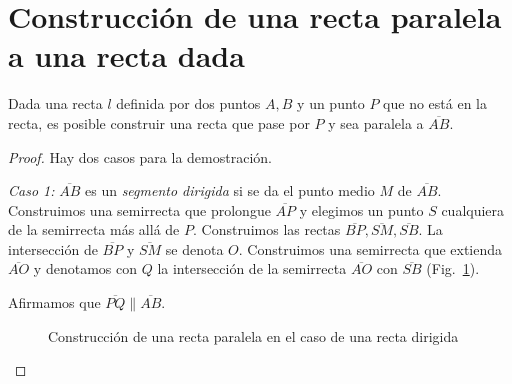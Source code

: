 \section{Construcción de una recta paralela a una recta dada}\label{s.parallel}

\begin{theorem}\label{thm.straight-parallel}
Dada una recta $l$ definida por dos puntos $A,B$ y un punto $P$ que no está en la recta, es posible construir una recta que pase por $P$ y sea paralela a $\overline{AB}$.
\end{theorem}

\begin{proof}

Hay dos casos para la demostración.

\textit{Caso 1:}
$\overline{AB}$ es un \emph{segmento dirigida} si se da el punto medio $M$ de $\overline{AB}$.  Construimos una semirrecta que prolongue $\overline{AP}$ y elegimos un punto $S$ cualquiera de la semirrecta más allá de $P$. Construimos las rectas $\overline{BP}, \overline{SM}, \overline{SB}$. La intersección de $\overline{BP}$ y $\overline{SM}$ se denota $O$. Construimos una semirrecta que extienda $\overline{AO}$ y denotamos con $Q$ la intersección de la semirrecta $\overline{AO}$ con $\overline{SB}$ (Fig.~\ref{f.se-parallel-directed}).

Afirmamos que $\overline{PQ}\parallel \overline{AB}$. 

\begin{figure}[ht]
\begin{center}
\end{center}
\caption{Construcción de una recta paralela en el caso de una recta dirigida}\label{f.se-parallel-directed}
\end{figure}


\end{proof}
